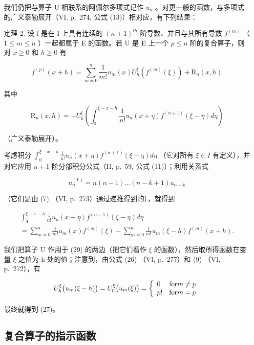 我们仍把与算子 U 相联系的阿佩尔多项式记作 \(u_{n}\) 。对更一般的函数，与多项式的广义泰勒展开（VI, p.~274, 公式 (13)）相对应，有下列结果：

定理 2. 设 f 是在 I 上具有连续的 \((n+1)^{th}\) 阶导数、并且与其所有导数 \(f^{(m)}\) （ \(1 \leqslant m \leqslant n\) ）一起都属于 E 的函数。若 U 是 E 上一个 \(p \leqslant n\) 阶的复合算子，则对 \(x \geqslant 0\) 和 \(h \geqslant 0\) 有

\[
f ^ {(p)} (x + h) = \sum_ {m = 0} ^ {n} \frac {1}{m !} u _ {m} (x) U _ {h} ^ {\xi} \left(f ^ {(m)} (\xi)\right) + \mathrm{R} _ {n} (x, h)\tag{27}
\]

其中

\[
\mathrm{R} _ {n} (x, h) = - U _ {h} ^ {\xi} \left(\int_ {0} ^ {\xi - x - h} \frac {1}{n !} u _ {n} (x + \eta) f ^ {(n + 1)} (\xi - \eta) d \eta\right)\tag{28}
\]

（广义泰勒展开）。

考虑积分 \(\int_{0}^{\xi-x-h}\frac{1}{n!}u_{n}(x+\eta)f^{(n+1)}(\xi-\eta)d\eta\) （它对所有 \(\xi\in I\) 有定义），并对它应用 \(n+1\) 阶分部积分公式（II, p.~59, 公式 (11)）；利用关系式

\[
u _ {n} ^ {(k)} = n (n - 1) \dots (n - k + 1) u _ {n - k}
\]

（它们是由 (7) （VI, p.~273）通过递推得到的），就得到

\[
\begin{array}{l} \int_ {0} ^ {\xi - x - h} \frac {1}{n !} u _ {n} (x + \eta) f ^ {(n + 1)} (\xi - \eta) d \eta \\ = \sum_ {m = 0} ^ {n} \frac {1}{m !} u _ {m} (x) f ^ {(m)} (\xi) - \sum_ {m = 0} ^ {n} \frac {1}{m !} u _ {m} (\xi - h) f ^ {(m)} (x + h). \end{array}\tag{29}
\]

我们把算子 U 作用于 (29) 的两边（把它们看作 \(\xi\) 的函数），然后取所得函数在变量 \(\xi\) 之值为 h 处的值；注意到，由公式 (26) （VI, p.~277）和 (9) （VI, p.~272），有

\[
U _ {h} ^ {\xi} \big (u _ {m} (\xi - h) \big) = U _ {0} ^ {\xi} \big (u _ {m} (\xi) \big) = \left\{ \begin{array}{l l} 0 & \text {for} m \neq p \\ p! & \text {for} m = p \end{array} \right.
\]

最终就得到 (27)。

\subsection{复合算子的指示函数}

